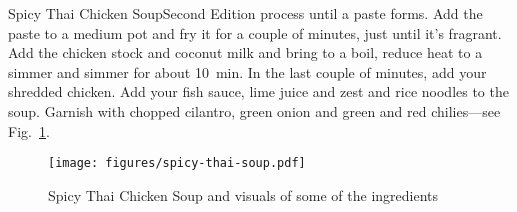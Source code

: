 \begin{entry}{Spicy Thai Chicken Soup}{Second Edition}
process until a paste forms. Add the paste to a medium pot and fry it for a
couple of minutes, just until it's fragrant. Add the chicken stock and coconut
milk and bring to a boil, reduce heat to a simmer and simmer for about
\SI{10}{\minute}. In the last couple of minutes, add your shredded chicken. Add
your fish sauce, lime juice and zest and rice noodles to the soup. Garnish with
chopped cilantro, green onion and green and red chilies---see
Fig.~\ref{fig:spicy-thai-soup}.
\begin{figure}
    \centering
    \texttt{[image: figures/spicy-thai-soup.pdf]}
    \caption{Spicy Thai Chicken Soup and visuals of some of the ingredients}
    \label{fig:spicy-thai-soup}
\end{figure}
\end{entry}

